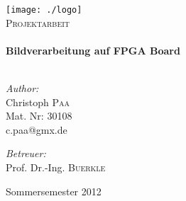 
\begin{titlepage}

\begin{center}


\texttt{[image: ./logo]}\\[1cm]    

\textsc{\Large Projektarbeit}\\[0.5cm]


\HRule \\[0.8cm]
{ \huge \bfseries Bildverarbeitung auf FPGA Board}\\[0.4cm]

\HRule \\[1.5cm]

\begin{minipage}[t]{0.4\textwidth}
\begin{flushleft} \large
\emph{Author:}\\
Christoph \textsc{Paa}\\
Mat. Nr: 30108\\
c.paa@gmx.de
\end{flushleft}
\end{minipage}
\begin{minipage}[t]{0.4\textwidth}
\begin{flushright} \large
\emph{Betreuer:} \\
Prof. Dr.-Ing. \textsc{Buerkle}\\
\end{flushright}
\end{minipage}

\vfill

{\large {Sommersemester 2012}}

\end{center}

\end{titlepage}